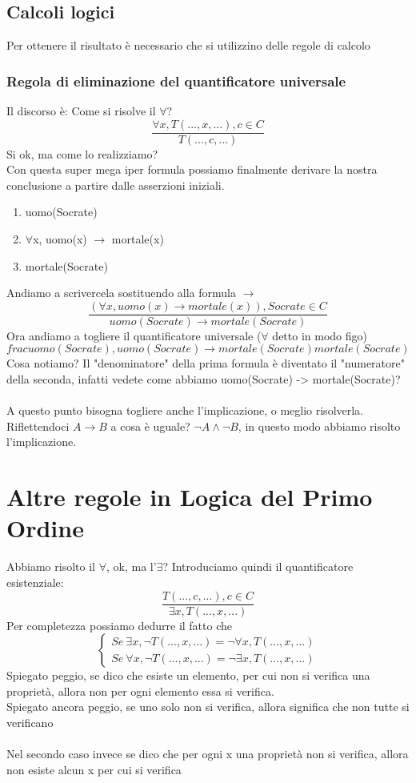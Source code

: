 \documentclass[12pt, a4paper, openany, oneside]{book}
\begin{document}
\subsection{Calcoli logici}
Per ottenere il risultato è necessario che si utilizzino delle regole di
calcolo %
\subsubsection{Regola di eliminazione del quantificatore universale}
Il discorso è: Come si risolve il $\forall$?
$$\frac{\forall x, T(..., x, ...), c\in C}{T(..., c, ...)} $$
Si ok, ma come lo realizziamo?  \\ 
Con questa super mega iper formula possiamo finalmente derivare la nostra
conclusione a partire dalle asserzioni iniziali. 
\begin{enumerate}
	\item uomo(Socrate)
	\item $\forall$x, uomo(x) $\to$ mortale(x)
	\item mortale(Socrate)
\end{enumerate}
Andiamo a scrivercela sostituendo alla formula $\to$
$$\frac{(\forall x, uomo(x) \to mortale(x)), Socrate\in C}{uomo(Socrate)\to 
mortale(Socrate)}$$
Ora andiamo a togliere il quantificatore universale ($\forall$ detto in modo figo)
$$frac{uomo(Socrate), uomo(Socrate) \to mortale(Socrate)}{mortale(Socrate)}$$
Cosa notiamo? Il "denominatore" della prima formula è diventato il "numeratore"
della seconda, infatti vedete come abbiamo uomo(Socrate) -> mortale(Socrate)?
\\ \\
A questo punto bisogna togliere anche l'implicazione, o meglio risolverla. 
Riflettendoci $A \to B$ a cosa è uguale? $\neg A \wedge \neg B$, in questo
modo abbiamo risolto l'implicazione.
\section{Altre regole in Logica del Primo Ordine}
Abbiamo risolto il $\forall$, ok, ma l'$\exists$?
Introduciamo quindi il quantificatore esistenziale:
$$\frac{T(..., c, ...), c\in C}{\exists x, T(..., x, ...)}$$
Per completezza possiamo dedurre il fatto che 
$$
\begin{cases}
Se ~ \exists x, \neg T(..., x, ...) = \neg \forall x, T(..., x, ...) \\
Se ~ \forall x, \neg T(..., x, ...) = \neg \exists x, T(..., x, ...)
\end{cases}$$
Spiegato peggio, se dico che esiste un elemento, per cui non si verifica una 
proprietà, allora non per ogni elemento essa si verifica. \\ 
Spiegato ancora peggio, se uno solo non si verifica, allora significa che non 
tutte si verificano \\ \\
Nel secondo caso invece se dico che per ogni x una proprietà non si verifica,
allora non esiste alcun x per cui si verifica 
\end{document}
